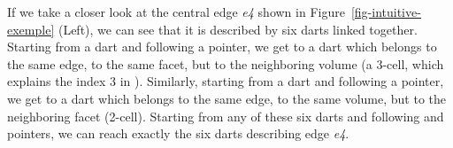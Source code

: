 If we take a closer look at the central edge \emph{e4} shown in
Figure~\ref{fig-intuitive-exemple} (Left), we can see that it is
described by six darts linked together.  Starting from a dart and
following a \betatrois{} pointer, we get to a dart which belongs to the
same edge, to the same facet, but to the neighboring volume (a 3-cell,
which explains the index 3 in \betatrois{}).  Similarly, starting from
a dart and following a \betadeux{} pointer, we get to a dart which
belongs to the same edge, to the same volume, but to the neighboring
facet (2-cell). Starting from any of these six darts and following
\betadeux{} and \betatrois{} pointers, we can reach exactly the six darts
describing edge \emph{e4}.
%
%
\def\LargFig{.3\textwidth}
